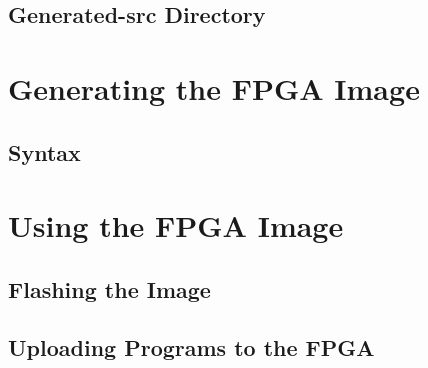 \subsection{Generated-src Directory}\label{sec:Customizing_FPGA-Generated-src_Directory}

\section{Generating the FPGA Image}\label{sec:Generating_FPGA_Image}
\subsection{Syntax}\label{sec:Generating_FPGA_Image-Syntax}


\section{Using the FPGA Image}\label{sec:Using_FPGA_Image}
\subsection{Flashing the Image}\label{sec:Flash_FPGA_Image}
\subsection{Uploading Programs to the FPGA}\label{sec:Upload_Programs_to_Flashed_FPGA}
